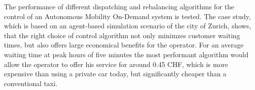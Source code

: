 The performance of different dispatching and rebalancing algorithms for the
control of an Autonomous Mobility On-Demand system is tested. The case study,
which is based on an agent-based simulation scenario of the city of Zurich,
shows, that the right choice of control algorithm not only minimzes customer
waiting times, but also offers large economical benefits for the operator.
For an average waiting time at peak hours of five minutes the most performant
algorithm would allow the operator to offer his service for around 0.45 CHF, which
is more expensive than using a private car today, but significantly cheaper than
a conventional taxi.

